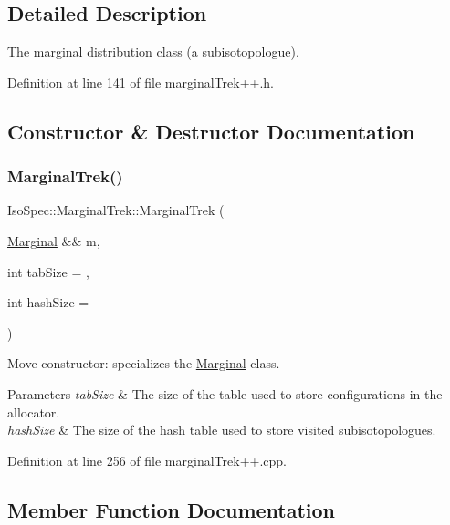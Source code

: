 \subsection{Detailed Description}
The marginal distribution class (a subisotopologue). 

Definition at line 141 of file marginal\+Trek++.\+h.



\subsection{Constructor \& Destructor Documentation}
\mbox{\label{class_iso_spec_1_1_marginal_trek_a83e70d522174e4e6724116941fd9c99e}} 
\subsubsection{\texorpdfstring{Marginal\+Trek()}{MarginalTrek()}}
{\footnotesize\ttfamily Iso\+Spec\+::\+Marginal\+Trek\+::\+Marginal\+Trek (\begin{DoxyParamCaption}\item[{\mbox{\hyperlink{class_iso_spec_1_1_marginal}{Marginal}} \&\&}]{m,  }\item[{int}]{tab\+Size = {},  }\item[{int}]{hash\+Size = {} }\end{DoxyParamCaption})}



Move constructor\+: specializes the \mbox{\hyperlink{class_iso_spec_1_1_marginal}{Marginal}} class. 


\begin{DoxyParams}{Parameters}
{\em tab\+Size} & The size of the table used to store configurations in the allocator. \\
\hline
{\em hash\+Size} & The size of the hash table used to store visited subisotopologues. \\
\hline
\end{DoxyParams}


Definition at line 256 of file marginal\+Trek++.\+cpp.



\subsection{Member Function Documentation}
\mbox{\label{class_iso_spec_1_1_marginal_trek_a4db6041328b818d123a017dda3c8b8ae}} 
